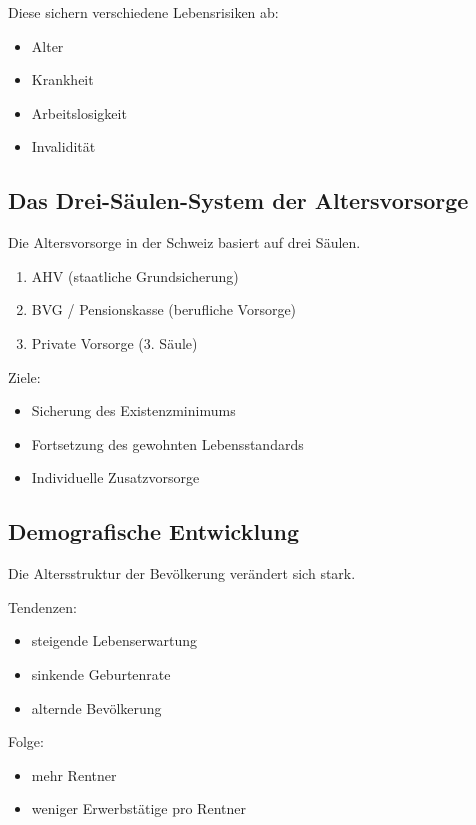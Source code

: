 Diese sichern verschiedene Lebensrisiken ab:

\begin{itemize}
\item Alter
\item Krankheit
\item Arbeitslosigkeit
\item Invalidität
\end{itemize}

\subsection{Das Drei-Säulen-System der Altersvorsorge}

Die Altersvorsorge in der Schweiz basiert auf drei Säulen.

\begin{enumerate}
\item AHV (staatliche Grundsicherung)
\item BVG / Pensionskasse (berufliche Vorsorge)
\item Private Vorsorge (3. Säule)
\end{enumerate}

Ziele:

\begin{itemize}
\item Sicherung des Existenzminimums
\item Fortsetzung des gewohnten Lebensstandards
\item Individuelle Zusatzvorsorge
\end{itemize}

\subsection{Demografische Entwicklung}

Die Altersstruktur der Bevölkerung verändert sich stark.

Tendenzen:

\begin{itemize}
\item steigende Lebenserwartung
\item sinkende Geburtenrate
\item alternde Bevölkerung
\end{itemize}

Folge:

\begin{itemize}
\item mehr Rentner
\item weniger Erwerbstätige pro Rentner
\end{itemize}

